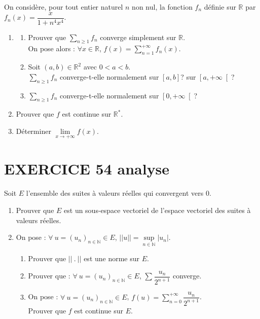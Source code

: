 \documentclass[10pt,oneside]{article}
\begin{document}
\begin{flushleft}
On considère, pour tout entier naturel $n$ non nul, la fonction $f_n$ définie sur $\mathbb{R}$ par $f_n(x)=\dfrac{x}{1+n^4x^4}$.
\begin{enumerate}
\item
\begin{enumerate}
\item
Prouver que $\displaystyle\sum\limits_{n\geqslant 1}^{}f_n$  converge simplement sur $\mathbb{R}$.\\
On pose alors : $\forall x\in\mathbb{R}$, $f(x)=\displaystyle\sum\limits_{n=1}^{+\infty}f_n(x)$.
\item
Soit $(a,b)\in\mathbb{R}^2$ avec $0<a<b$.\\
$\displaystyle\sum\limits_{n\geqslant 1}^{}f_n$ converge-t-elle normalement sur $\left[a,b \right]$? sur $\left[ a,+\infty\right[$?  
\item
$\displaystyle\sum\limits_{n\geqslant 1}^{}f_n$ converge-t-elle normalement sur $\left[ 0,+\infty\right[ $?
\end{enumerate}
\item
Prouver que $f$ est continue sur $\mathbb{R}^*$.
\item
Déterminer $\lim\limits_{x\to+\infty}^{}f(x)$.
\end{enumerate}
\medskip

\section*{EXERCICE 54 \:analyse }


Soit $E$ l'ensemble des suites à valeurs réelles qui convergent vers $0$.\\

\begin{enumerate}
\item
Prouver que $E$ est un sous-espace vectoriel de l'espace vectoriel des suites à valeurs réelles.
\item
On pose : $\forall\: u=(u_n)_{n\in\mathbb{N}}\in E$, $||u||=\sup\limits_{n\in\mathbb{N}}|u_n|$.
\begin{enumerate}
\item
Prouver que $||\:.\:||$ est une norme sur $E$.


\item
Prouver que :  $\forall\: u=(u_n)_{n\in\mathbb{N}}\in E$, $\displaystyle\sum\limits_{}^{}\dfrac{u_n}{2^{n+1}}$ converge.\\

\item
On pose : $\forall\: u=(u_n)_{n\in\mathbb{N}}\in E$, $f(u)=\displaystyle\sum\limits_{n=0}^{+\infty}\dfrac{u_n}{2^{n+1}}$.\\
Prouver que $f$ est continue sur $E$.


\end{enumerate}
\end{enumerate}
\end{flushleft}
\end{document}
